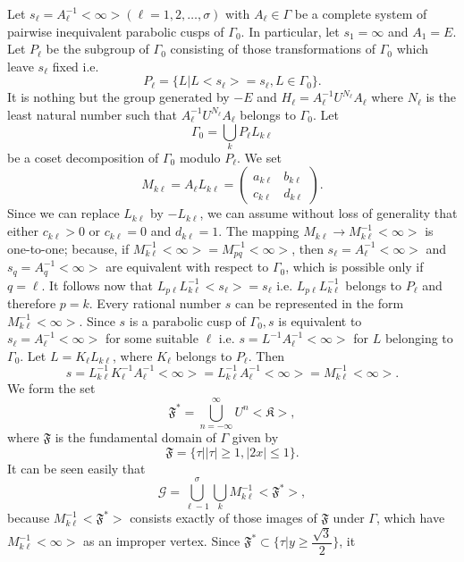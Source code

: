 Let $s_{\ell}=A^{-1}_{\ell}<\infty>(\ell = 1,2,\ldots, \sigma)$ with
$A_{\ell} \in \Gamma$ be a complete system of pairwise
inequivalent parabolic cusps of $\Gamma_0$. In particular, let
$s_1=\infty$ and $A_1=E$. Let $P_{\ell}$ be the subgroup of $\Gamma_0$
consisting of those transformations of $\Gamma_0$ which leave
$s_{\ell}$ fixed i.e.
$$
P_{\ell} = \{L|L<s_{\ell}> = s_{\ell}, L \in \Gamma_0\}.
$$
It is nothing but the group generated by $-E$ and $H_{\ell} =
A^{-1}_{\ell}U^{N_{\ell}} A_{\ell}$ where $N_{\ell}$ is the least
natural number such that $A^{-1}_{\ell} U^{N_{\ell}} A_{\ell}$ belongs
to $\Gamma_0$. Let 
$$
\Gamma_0 = \bigcup_k P_{\ell} L_{k\ell}
$$
be a coset decomposition of $\Gamma_0$ modulo $P_{\ell}$. We set
$$
M_{k\ell} = A_{\ell} L_{k\ell} = \begin{pmatrix}
a_{k\ell} & b_{k\ell}\\
c_{k\ell} & d_{k\ell}
\end{pmatrix}.
$$
Since we can replace $L_{k\ell}$ by $-L_{k\ell}$, we can assume without
loss of generality that either $c_{k\ell}>0$ or $c_{k\ell}=0$ and
$d_{k\ell}=1$. The mapping $M_{k\ell}\to M^{-1}_{k\ell} <\infty>$ is
one-to-one; because, if $M^{-1}_{k\ell}<\infty>=M^{-1}_{pq}<\infty>$,
then $s_{\ell}=A^{-1}_{\ell}<\infty>$ and $s_q=A^{-1}_q<\infty>$ are
equivalent with respect to $\Gamma_0$, which is possible only if
$q=\ell$. It follows now that
$L_{p\ell}L^{-1}_{k\ell}<s_{\ell}>=s_{\ell}$ i.e. $L_{p\ell}
L^{-1}_{k\ell}$ belongs to $P_{\ell}$ and \pageoriginale therefore
$p=k$. Every rational number $s$ can be represented in the form
$M^{-1}_{k\ell}<\infty>$. Since $s$ is a parabolic cusp of
$\Gamma_0,s$ is equivalent to $s_{\ell}=A^{-1}_{\ell}<\infty>$ for
some suitable $\ell$ i.e. $s=L^{-1}A^{-1}_{\ell}<\infty>$ for $L$
belonging to $\Gamma_0$. Let $L=K_{\ell}L_{k\ell}$, where $K_{\ell}$
belongs to $P_{\ell}$. Then 
$$
s=L^{-1}_{k\ell} K^{-1}_{\ell} A^{-1}_{\ell} <\infty> = L^{-1}_{k\ell}
A^{-1}_{\ell} <\infty> = M^{-1}_{k\ell} <\infty>.
$$
We form the set
$$
\mathfrak{F}^{\ast} = \bigcup^{\infty}_{n=-\infty} U^n <\mathfrak{K}>,
$$
where $\mathfrak{F}$ is the fundamental domain of $\Gamma$ given by 
$$
\mathfrak{F} =\{\tau ||\tau| \geq 1, |2x| \leq 1\}.
$$
It can be seen easily that 
$$
\mathscr{G} = \bigcup^{\sigma}_{\ell-1} \bigcup_k M^{-1}_{k\ell}
<\mathfrak{F}^{\ast}>, 
$$
because $M^{-1}_{k\ell}<\mathfrak{F}^{\ast}>$ consists exactly of
those images of $\mathfrak{F}$ under $\Gamma$, which have
$M^{-1}_{k\ell}<\infty>$ as an improper vertex. Since
$\mathfrak{F}^{\ast}\subset \{\tau |y\geq \dfrac{\surd3}{2}\}$, it
